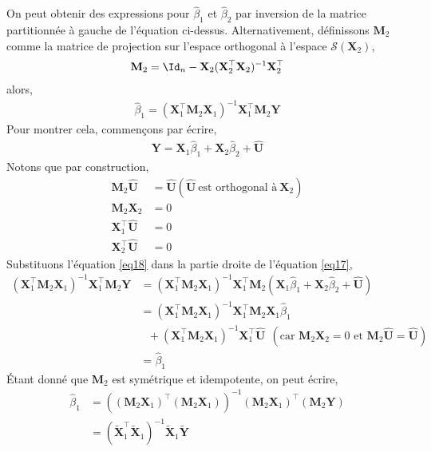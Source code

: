 On peut  obtenir des expressions pour $\widehat{\beta}_1$ et $\widehat{\beta}_2$ par inversion de la matrice partitionnée à gauche de l'équation ci-dessus. Alternativement, définissons $\mathbf{M}_2$ comme la matrice de projection sur l'espace orthogonal à l'espace $\mathcal{S}(\mathbf{X}_2)$,
\begin{align*}
\mathbf{M}_2 = \Id_n - \mathbf{X}_2(\mathbf{X}_2^\top\mathbf{X}_2)^{-1}\mathbf{X}_2^\top
\end{align*}
alors,
\begin{align}
\widehat{\beta}_1 = (\mathbf{X}_1^\top\mathbf{M}_2 \mathbf{X}_1)^{-1}\mathbf{X}_1^\top\mathbf{M}_2\mathbf{Y}
\label{eq17}
\end{align}
Pour montrer cela, commençons par écrire,
\begin{align}
\mathbf{Y} = \mathbf{X}_1\widehat{\beta}_1+\mathbf{X}_2\widehat{\beta}_2 + \widehat{\mathbf{U}}
\label{eq18}
\end{align} 
Notons que par construction,
\begin{align*}
\mathbf{M}_2\widehat{\mathbf{U}} &= \widehat{\mathbf{U}}(\widehat{\mathbf{U}} \ \textrm{est orthogonal à} \ \mathbf{X}_2)\\
\mathbf{M}_2\mathbf{X}_2 &= 0\\
\mathbf{X}_1^\top\widehat{\mathbf{U}} &=0\\
\mathbf{X}_2^\top\widehat{\mathbf{U}} &=0
\end{align*}
Substituons l'équation \eqref{eq18} dans la partie droite de l'équation \eqref{eq17},
\begin{align*}
\left(\mathbf{X}_1^\top\mathbf{M}_2\mathbf{X}_1\right)^{-1}
\mathbf{X}_1^\top\mathbf{M}_2\mathbf{Y}&=\left(\mathbf{X}_1^\top\mathbf{M}_2\mathbf{X}_1\right)^{-1}
\mathbf{X}_1^\top\mathbf{M}_2\left(\mathbf{X}_1\widehat{\beta}_1+\mathbf{X}_2\widehat{\beta}_2 + \widehat{\mathbf{U}}\right)\\
&=\left(\mathbf{X}_1^\top\mathbf{M}_2\mathbf{X}_1\right)^{-1}
\mathbf{X}_1^\top\mathbf{M}_2\mathbf{X}_1\widehat{\beta}_1\\
 &\ \ \ +
\left(\mathbf{X}_1^\top\mathbf{M}_2\mathbf{X}_1\right)^{-1}
\mathbf{X}_1^\top\widehat{\mathbf{U}} \ \ (\textrm{car \ }\mathbf{M}_2\mathbf{X}_2 = 0 \textrm{ \ et \ } 
 \mathbf{M}_2\widehat{\mathbf{U}} = \widehat{\mathbf{U}})\\
&=\widehat{\beta}_1
\end{align*}
\'Etant donné que $\mathbf{M}_2$ est symétrique et idempotente, on peut écrire,
\begin{align*}
\widehat{\beta}_1 &= \left((\mathbf{M}_2\mathbf{X}_1)^\top(\mathbf{M}_2\mathbf{X}_1)\right)^{-1}
(\mathbf{M}_2\mathbf{X}_1)^\top(\mathbf{M}_2\mathbf{Y})\\
&=\left(\tilde{\mathbf{X}}_1^\top\tilde{\mathbf{X}}_1\right)^{-1}\tilde{\mathbf{X}}_1\tilde{\mathbf{Y}}
\end{align*}
